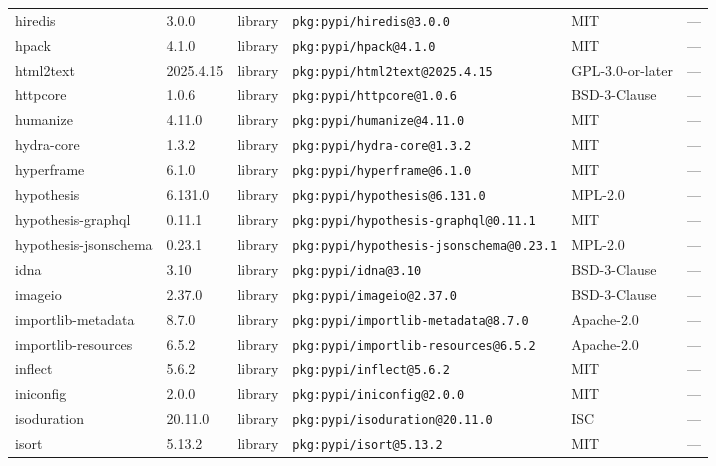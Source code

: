 \documentclass[11pt,a4paper]{article}
\begin{document}
\begin{longtable}{|p{4cm}|p{2cm}|p{1.6cm}|p{5cm}|p{1.5cm}|p{3.5cm}|}
\raggedright hiredis & 3.0.0 & library & \small\texttt{pkg:pypi/hiredis@3.0.0} & MIT & \small — \\
\raggedright hpack & 4.1.0 & library & \small\texttt{pkg:pypi/hpack@4.1.0} & MIT & \small — \\
\raggedright html2text & 2025.4.15 & library & \small\texttt{pkg:pypi/html2text@2025.4.15} & GPL-3.0-or-later & \small — \\
\raggedright httpcore & 1.0.6 & library & \small\texttt{pkg:pypi/httpcore@1.0.6} & BSD-3-Clause & \small — \\
\raggedright humanize & 4.11.0 & library & \small\texttt{pkg:pypi/humanize@4.11.0} & MIT & \small — \\
\raggedright hydra-core & 1.3.2 & library & \small\texttt{pkg:pypi/hydra-core@1.3.2} & MIT & \small — \\
\raggedright hyperframe & 6.1.0 & library & \small\texttt{pkg:pypi/hyperframe@6.1.0} & MIT & \small — \\
\raggedright hypothesis & 6.131.0 & library & \small\texttt{pkg:pypi/hypothesis@6.131.0} & MPL-2.0 & \small — \\
\raggedright hypothesis-graphql & 0.11.1 & library & \small\texttt{pkg:pypi/hypothesis-graphql@0.11.1} & MIT & \small — \\
\raggedright hypothesis-jsonschema & 0.23.1 & library & \small\texttt{pkg:pypi/hypothesis-jsonschema@0.23.1} & MPL-2.0 & \small — \\
\raggedright idna & 3.10 & library & \small\texttt{pkg:pypi/idna@3.10} & BSD-3-Clause & \small — \\
\raggedright imageio & 2.37.0 & library & \small\texttt{pkg:pypi/imageio@2.37.0} & BSD-3-Clause & \small — \\
\raggedright importlib-metadata & 8.7.0 & library & \small\texttt{pkg:pypi/importlib-metadata@8.7.0} & Apache-2.0 & \small — \\
\raggedright importlib-resources & 6.5.2 & library & \small\texttt{pkg:pypi/importlib-resources@6.5.2} & Apache-2.0 & \small — \\
\raggedright inflect & 5.6.2 & library & \small\texttt{pkg:pypi/inflect@5.6.2} & MIT & \small — \\
\raggedright iniconfig & 2.0.0 & library & \small\texttt{pkg:pypi/iniconfig@2.0.0} & MIT & \small — \\
\raggedright isoduration & 20.11.0 & library & \small\texttt{pkg:pypi/isoduration@20.11.0} & ISC & \small — \\
\raggedright isort & 5.13.2 & library & \small\texttt{pkg:pypi/isort@5.13.2} & MIT & \small — \\

\end{longtable}
\end{document}
